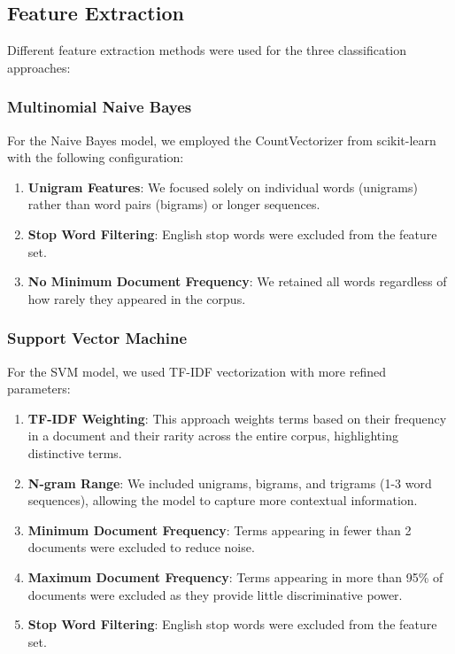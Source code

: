 \documentclass[conference]{IEEEtran}
\begin{document}
\subsection{Feature Extraction}
Different feature extraction methods were used for the three classification approaches:

\subsubsection{Multinomial Naive Bayes}
For the Naive Bayes model, we employed the CountVectorizer from scikit-learn with the following configuration:
\begin{enumerate}
\item \textbf{Unigram Features}: We focused solely on individual words (unigrams) rather than word pairs (bigrams) or longer sequences.
\item \textbf{Stop Word Filtering}: English stop words were excluded from the feature set.
\item \textbf{No Minimum Document Frequency}: We retained all words regardless of how rarely they appeared in the corpus.
\end{enumerate}

\subsubsection{Support Vector Machine}
For the SVM model, we used TF-IDF vectorization with more refined parameters:
\begin{enumerate}
\item \textbf{TF-IDF Weighting}: This approach weights terms based on their frequency in a document and their rarity across the entire corpus, highlighting distinctive terms.
\item \textbf{N-gram Range}: We included unigrams, bigrams, and trigrams (1-3 word sequences), allowing the model to capture more contextual information.
\item \textbf{Minimum Document Frequency}: Terms appearing in fewer than 2 documents were excluded to reduce noise.
\item \textbf{Maximum Document Frequency}: Terms appearing in more than 95\% of documents were excluded as they provide little discriminative power.
\item \textbf{Stop Word Filtering}: English stop words were excluded from the feature set.
\end{enumerate}
\end{document}
